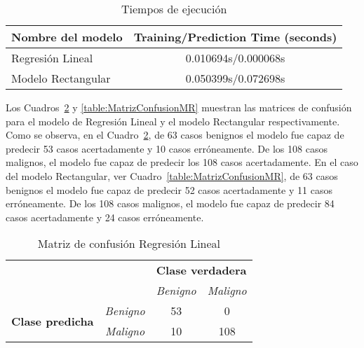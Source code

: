 \documentclass[conference]{IEEEtran}
\begin{document}
\begin{table}[H]
	\caption{Tiempos de ejecución}
	\label{table:TiemposEjecucion}
	\begin{center}
		\begin{tabular}{|l|c|}
			\hline
			\textbf{Nombre del modelo} &  Training/Prediction Time (seconds) \\ \hline
			Regresión Lineal           &  0.010694s/0.000068s \\ \hline
			Modelo Rectangular         &  0.050399s/0.072698s \\ \hline
		\end{tabular}
	\end{center}
\end{table}

Los Cuadros~\ref{table:MatrizConfusionRL} y \ref{table:MatrizConfusionMR} muestran las matrices de confusión para el modelo de Regresión Lineal y el modelo Rectangular respectivamente. Como se observa, en el Cuadro~\ref{table:MatrizConfusionRL}, de 63 casos benignos el modelo fue capaz de predecir 53 casos acertadamente y 10 casos erróneamente. De los 108 casos malignos, el modelo fue capaz de predecir los 108 casos acertadamente. En el caso del modelo Rectangular, ver Cuadro~\ref{table:MatrizConfusionMR}, de 63 casos benignos el modelo fue capaz de predecir 52 casos acertadamente y 11 casos erróneamente. De los 108 casos malignos, el modelo fue capaz de predecir 84 casos acertadamente y 24 casos erróneamente.

\begin{table}[H]
	\caption{Matriz de confusión Regresión Lineal}
	\label{table:MatrizConfusionRL}
	\begin{center}
		\begin{tabular}{cc|c|c|}
			\cline{3-4}
            &  & \multicolumn{2}{c|}{\textbf{Clase verdadera}} \\ \cline{3-4} 
            &  & \textit{Benigno}   & \textit{Maligno}   \\ \hline
			\multicolumn{1}{|c|}{\multirow{2}{*}{\textbf{Clase predicha}}} & \textit{Benigno} & 53  & 0 \\ \cline{2-4} 
			\multicolumn{1}{|c|}{} & \textit{Maligno} & 10 & 108 \\ \hline
		\end{tabular}
	\end{center}
\end{table}
\end{document}
